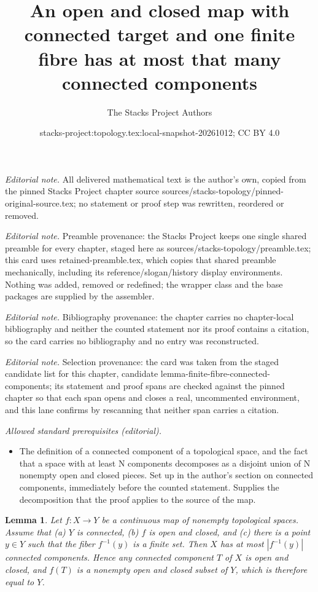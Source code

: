 \documentclass[10pt,a4paper]{amsart}
\title{An open and closed map with connected target and one finite fibre has at most that many connected components}
\author{The Stacks Project Authors}
\date{stacks-project:topology.tex:local-snapshot-20261012; CC BY 4.0}
\theoremstyle{plain}
\newtheorem{lemma}[subsection]{Lemma}
\theoremstyle{definition}
\theoremstyle{remark}
\numberwithin{equation}{subsection}
\begin{document}
\maketitle
\noindent\textit{Editorial note.} All delivered mathematical text is the author's own, copied from the pinned Stacks Project chapter source sources/stacks-topology/pinned-original-source.tex; no statement or proof step was rewritten, reordered or removed.\par\medskip
\noindent\textit{Editorial note.} Preamble provenance: the Stacks Project keeps one single shared preamble for every chapter, staged here as sources/stacks-topology/preamble.tex; this card uses retained-preamble.tex, which copies that shared preamble mechanically, including its reference/slogan/history display environments. Nothing was added, removed or redefined; the wrapper class and the base packages are supplied by the assembler.\par\medskip
\noindent\textit{Editorial note.} Bibliography provenance: the chapter carries no chapter-local bibliography and neither the counted statement nor its proof contains a citation, so the card carries no bibliography and no entry was reconstructed.\par\medskip
\noindent\textit{Editorial note.} Selection provenance: the card was taken from the staged candidate list for this chapter, candidate lemma-finite-fibre-connected-components; its statement and proof spans are checked against the pinned chapter so that each span opens and closes a real, uncommented environment, and this lane confirms by rescanning that neither span carries a citation.\par\medskip
\noindent\textit{Allowed standard prerequisites (editorial).}\begin{itemize}
\item The definition of a connected component of a topological space, and the fact that a space with at least N components decomposes as a disjoint union of N nonempty open and closed pieces. Set up in the author's section on connected components, immediately before the counted statement. Supplies the decomposition that the proof applies to the source of the map.
\end{itemize}\medskip
\begin{lemma}
\label{lemma-finite-fibre-connected-components}
Let $f : X \to Y$ be a continuous map of nonempty topological spaces. Assume
that
(a) $Y$ is connected,
(b) $f$ is open and closed, and
(c) there is a point $y\in Y$ such that the fiber $f^{-1}(y)$ is a finite set.
Then $X$ has at most $|f^{-1}(y)|$ connected components. Hence any connected 
component $T$ of $X$ is open and closed, and $f(T)$ is a nonempty open and 
closed subset of $Y$, which is therefore equal to $Y$.
\end{lemma}
\end{document}
